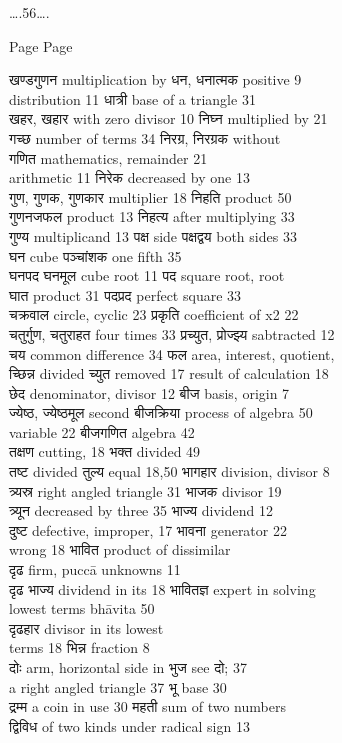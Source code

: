 \documentclass[]{article}
\date{}
\begin{document}
\ldots{}.56\ldots{}.

Page Page

खण्डगुणन multiplication by धन, धनात्मक positive 9\\
distribution 11 धात्री base of a triangle 31\\
खहर, खहार with zero divisor { } 10 निघ्न multiplied by { } 21\\
गच्छ number of terms { }34 निरग्र, निरग्रक without\\
गणित mathematics, remainder 21\\
arithmetic 11 निरेक decreased by one 13\\
गुण, गुणक, गुणकार multiplier 18 निहति product 50\\
गुणनजफल product 13 निहत्य after multiplying 33\\
गुण्य multiplicand { } { } 13 पक्ष side पक्षद्वय both sides 33\\
घन cube { }{ }पञ्चांशक one fifth 35\\
घनपद घनमूल cube root { }11 { }पद square root, root\\
घात product 31 पदप्रद perfect square 33\\
चक्रवाल circle, cyclic 23 प्रकृति coefficient of {x}{2 }22\\
चतुर्गुण, चतुराहत four times 33 प्रच्युत, प्रोज्झ्य sabtracted 12\\
चय common difference 34 फल area, interest, quotient,\\
च्छिन्न divided च्युत removed 17 result of calculation 18\\
छेद denominator, divisor { } 12 बीज basis, origin 7\\
ज्येष्ठ, ज्येष्ठमूल second बीजक्रिया process of algebra 50\\
variable 22 बीजगणित algebra 42\\
तक्षण cutting, 18 भक्त divided 49\\
तष्ट divided तुल्य equal 18,50 भागहार division, divisor 8\\
त्र्यस्र right angled triangle { }31 भाजक divisor 19\\
त्र्यून decreased by three { }35 भाज्य dividend 12\\
दुष्ट defective, improper, 17 भावना generator 22\\
wrong 18 भावित product of dissimilar\\
दृढ firm, puccā unknowns 11\\
दृढ भाज्य dividend in its 18 भावितज्ञ expert in solving\\
lowest terms bhāvita 50\\
दृढहार divisor in its lowest\\
terms 18 {भिन्न} fraction 8\\
दोः arm, horizontal side in भुज see दो; 37\\
a right angled triangle { } 37 भू base 30\\
द्रम्म a coin in use 30 महती sum of two numbers\\
द्विविध of two kinds under radical sign 13
\end{document}
